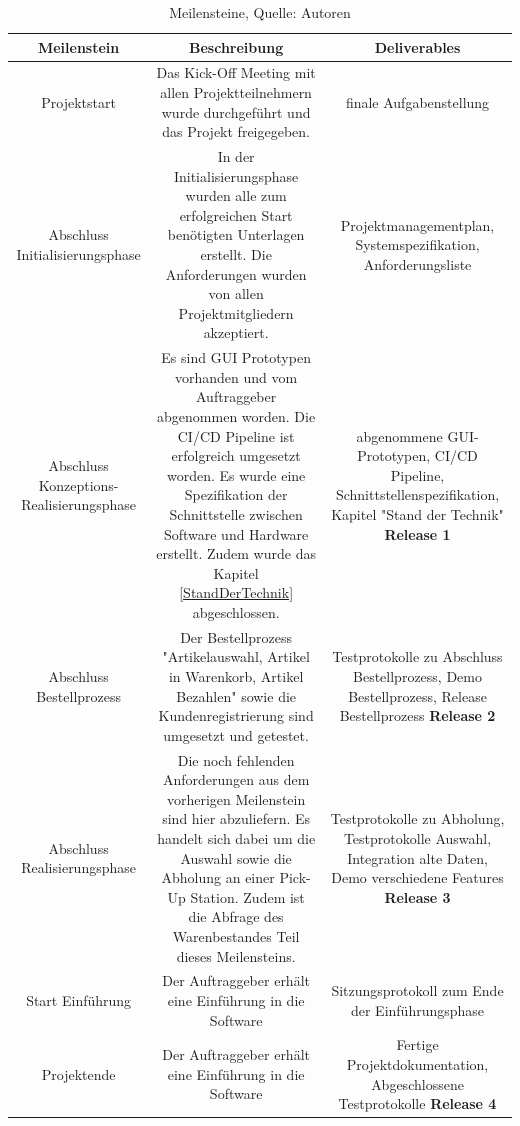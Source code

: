 \begin{table}[H]
\setlength\extrarowheight{2pt} %
\begin{tabularx}{\textwidth}{|C|C|C|}
\hline
\textbf{Meilenstein} &  \textbf{Beschreibung} & \textbf{Deliverables}  \\

\hline
Projektstart & Das Kick-Off Meeting mit allen Projektteilnehmern wurde durchgeführt und das Projekt freigegeben. & finale Aufgabenstellung\\

\hline
Abschluss Initialisierungsphase & In der Initialisierungsphase wurden alle zum erfolgreichen Start benötigten Unterlagen erstellt. Die Anforderungen wurden von allen Projektmitgliedern akzeptiert. & Projektmanagementplan, Systemspezifikation, Anforderungsliste\\

\hline
Abschluss Konzeptions-Realisierungsphase & Es sind GUI Prototypen vorhanden und vom Auftraggeber abgenommen worden. Die CI/CD Pipeline ist erfolgreich umgesetzt worden. Es wurde eine Spezifikation der Schnittstelle zwischen Software und Hardware erstellt. Zudem wurde das Kapitel \ref{StandDerTechnik} abgeschlossen. & abgenommene GUI-Prototypen, CI/CD Pipeline, Schnittstellenspezifikation, Kapitel "Stand der Technik"
\newline \textbf{Release 1}
\\

\hline
Abschluss Bestellprozess & Der Bestellprozess "Artikelauswahl, Artikel in Warenkorb, Artikel Bezahlen" sowie die Kundenregistrierung sind umgesetzt und getestet. & Testprotokolle zu Abschluss Bestellprozess, Demo Bestellprozess, Release Bestellprozess 
\newline
\textbf{Release 2}
 \\

\hline
Abschluss Realisierungsphase & Die noch fehlenden Anforderungen aus dem vorherigen Meilenstein sind hier abzuliefern. Es handelt sich dabei um die Auswahl sowie die Abholung an einer Pick-Up Station. Zudem ist die Abfrage des Warenbestandes Teil dieses Meilensteins. & Testprotokolle zu Abholung, Testprotokolle Auswahl, Integration alte Daten, Demo verschiedene Features
\newline
\textbf {Release 3}
\\

\hline
Start Einführung & Der Auftraggeber erhält eine Einführung in die Software & Sitzungsprotokoll zum Ende der Einführungsphase  
\\

\hline
Projektende & Der Auftraggeber erhält eine Einführung in die Software & Fertige Projektdokumentation, Abgeschlossene Testprotokolle   
\newline
\textbf{Release 4}
\\
\hline
\end{tabularx}
\caption{ \label{tbl: Meilensteine}Meilensteine, Quelle: Autoren}
\end{table}
\newpage

